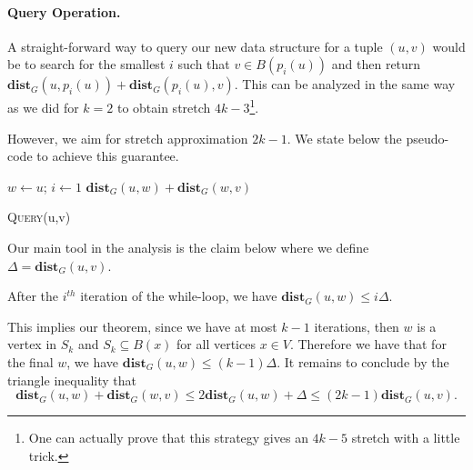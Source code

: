 \paragraph{Query Operation.} A straight-forward way to query our new data structure for a tuple $(u,v)$ would be to search for the smallest $i$ such that $v \in B(p_i(u))$ and then return $\mathbf{dist}_G(u, p_i(u)) + \mathbf{dist}_G(p_i(u), v)$. This can be analyzed in the same way as we did for $k=2$ to obtain stretch $4k-3$\footnote{One can actually prove that this strategy gives an $4k-5$ stretch with a little trick.}.

However, we aim for stretch approximation $2k-1$. We state below the pseudo-code to achieve this guarantee.

\begin{algorithm}
  \SetAlgoLined
  $w \gets u$; $i \gets 1$\;
  \Return $\mathbf{dist}_G(u,w) + \mathbf{dist}_G(w,v)$
  \caption{\textsc{Query}(u,v)}
\end{algorithm}

Our main tool in the analysis is the claim below where we define $\Delta = \mathbf{dist}_G(u,v)$. 

\begin{claim}\label{claim:DistanceOracleSwapping} After the $i^{th}$ iteration of the while-loop, we have $\mathbf{dist}_G(u,w) \leq i\Delta$.
\end{claim}

This implies our theorem, since we have at most $k-1$ iterations, then $w$ is a vertex in $S_k$ and $S_k \subseteq B(x)$ for all vertices $x \in V$. Therefore we have that for the final $w$, we have $\mathbf{dist}_G(u,w) \leq (k-1)\Delta$. It remains to conclude by the triangle inequality that 
\[
\mathbf{dist}_G(u,w) + \mathbf{dist}_G(w,v) \leq 2\mathbf{dist}_G(u,w) + \Delta \leq (2k-1)\mathbf{dist}_G(u,v).
\]

